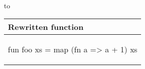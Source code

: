 \begin{example}
\noindent
to

\begin{center}
  \begin{tabular}{|l|}
    \hline
    \textbf{Rewritten function} \\ \hline
  \begin{sml}
fun foo xs = map (fn a => a + 1) xs
  \end{sml} \\ \hline
\end{tabular}

\end{center}

\end{example}



